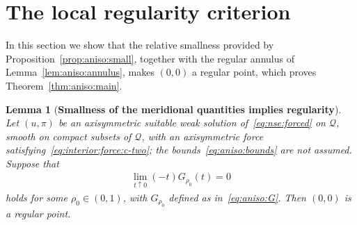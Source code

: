 \documentclass[11pt,reqno]{amsproc}
\numberwithin{equation}{section}
\newtheorem{lemma}[theorem]{Lemma}
\theoremstyle{remark}
\begin{document}
\section{The local regularity criterion}
\label{sec:aniso:closure}

In this section we show that the relative smallness provided by Proposition~\ref{prop:aniso:small}, together with the regular annulus of Lemma~\ref{lem:aniso:annulus}, makes $(0,0)$ a regular point, which proves Theorem~\ref{thm:aniso:main}. 

\begin{lemma}[{\bf Smallness of the meridional quantities implies regularity}]
\label{lem:aniso:closure}
Let $(u,\pi)$ be an axisymmetric suitable weak solution of~\eqref{eq:nse:forced} on $\mathcal Q$, smooth on compact subsets of $\mathcal Q$, with an axisymmetric force satisfying~\eqref{eq:interior:force:c-two}; the bounds~\eqref{eq:aniso:bounds} are not assumed. Suppose that
\begin{align}
\lim_{t\uparrow0}(-t)G_{\rho_0}(t)=0
\label{eq:aniso:closure:small}
\end{align}
holds for some $\rho_0\in(0,1)$, with $G_{\rho_0}$ defined as in~\eqref{eq:aniso:G}. Then $(0,0)$ is a regular point.
\end{lemma}
\end{document}
